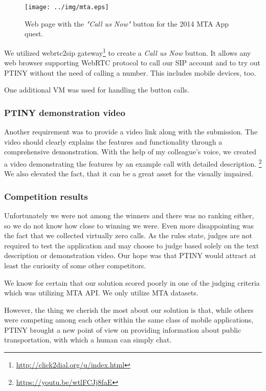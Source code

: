 \begin{figure}[ht]
\centering
\texttt{[image: ../img/mta.eps]}
\caption{Web page with the \textit{"Call us Now"} button for the 2014 \ac{MTA} App quest.}
\label{fig:mta}
\end{figure}

We utilized webrtc2sip gateway\footnote{\url{http://click2dial.org/u/index.html}} to create a \textit{Call us Now} button.
It allows any web browser supporting WebRTC protocol to call our \ac{SIP} account and to try out \ac{PTINY} without the need of calling a number.
This includes mobile devices, too.

One additional \ac{VM} was used for handling the button calls.

\subsubsection{\ac{PTINY} demonstration video}

Another requirement was to provide a video link along with the submission.
The video should clearly explains the features and functionality through a comprehensive demonstration.
With the help of my colleague's voice, we created a video demonstrating the features by an example call with detailed description. \footnote{\url{https://youtu.be/wtlFCJj8faE}}
We also elevated the fact, that it can be a great asset for the visually impaired.

\subsubsection{Competition results}

Unfortunately we were not among the winners and there was no ranking either, so we do not know how close to winning we were.
Even more disappointing was the fact that we collected virtually zero calls.
As the rules state, judges are not required to test the application and may choose to judge based solely on the text description or demonstration video.
Our hope was that \ac{PTINY} would attract at least the curiosity of some other competitors.

We know for certain that our solution scored poorly in one of the judging criteria which was utilizing \ac{MTA} \ac{API}.
We only utilize \ac{MTA} datasets.

However, the thing we cherish the most about our solution is that, while others were competing among each other within the same class of mobile applications, \ac{PTINY} brought a new point of view on providing information about public transportation, with which a human can simply chat.

